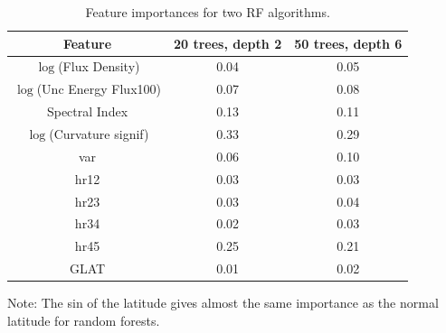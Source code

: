 \begin{table}[!h]
    \tiny
    \centering
    \renewcommand{\tabcolsep}{1mm}
\renewcommand{\arraystretch}{1}

    \begin{tabular}{|c|c|c|}
    \hline
    Feature &  20 trees, depth 2& 50 trees, depth 6\\
    \hline
    $\log$(Flux Density) & 0.04 & 0.05        \\
    \hline
    $\log$(Unc Energy Flux100) & 0.07     & 0.08 \\
    \hline %
   Spectral Index & 0.13     &   0.11\\
    \hline %
    $\log$(Curvature signif) & 0.33 &0.29  \\
    \hline
   var&  0.06   &  0.10  \\
    \hline %
    hr12& 0.03 &0.03 \\
    \hline
     hr23& 0.03 &0.04 \\
    \hline
    hr34& 0.02 &0.03 \\
    \hline
   hr45& 0.25 &0.21 \\
    \hline
    GLAT&0.01&0.02\\
    \hline
    \end{tabular}
    \vspace{0.4cm}
    \caption{Feature importances for two RF algorithms.}
    \label{tab:feat_imp}
\end{table}

Note: The sin of the latitude gives almost the same importance as the normal latitude for random forests.


